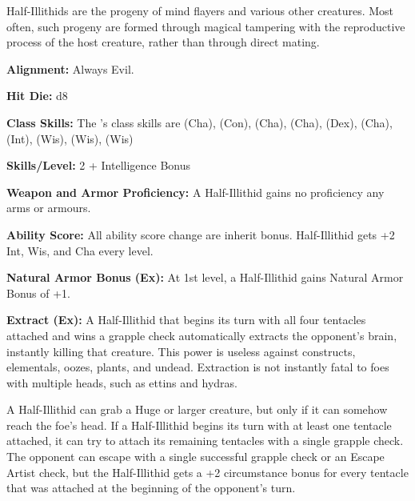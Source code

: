 
Half-Illithids are the progeny of mind flayers and various other creatures. Most often, such progeny are formed through magical tampering with the reproductive process of the host creature, rather than through direct mating.

\textbf{Alignment:} Always Evil.

\textbf{Hit Die:} d8

\textbf{Class Skills:} The \currentclassname{}'s class skills are  (Cha),  (Con),  (Cha),  (Cha),  (Dex),  (Cha),  (Int),  (Wis),  (Wis),  (Wis)

\textbf{Skills/Level:} 2 + Intelligence Bonus

\modebab{}
\poorfor{}
\poorref{}
\goodwil{}

\begin{classtable}
\end{classtable}

\classfeatures

\textbf{Weapon and Armor Proficiency:} A Half-Illithid gains no proficiency any arms or armours.

\textbf{Ability Score:} All ability score change are inherit bonus. Half-Illithid gets +2 Int, Wis, and Cha every level.
 
\textbf{Natural Armor Bonus (Ex):} At 1st level, a Half-Illithid gains Natural Armor Bonus of +1.
 
 \textbf{Extract (Ex):} A Half-Illithid that begins its turn with all four tentacles attached and wins a grapple check automatically extracts the opponent’s brain, instantly killing that creature.
This power is useless against constructs, elementals, oozes, plants, and undead. Extraction is not instantly fatal to foes with multiple heads, such as ettins and hydras.

A Half-Illithid can grab a Huge or larger creature, but only if it can somehow reach the foe’s head. If a Half-Illithid begins its turn with at least one tentacle attached, it can try to attach its remaining tentacles with a single grapple check. The opponent can escape with a single successful grapple check or an Escape Artist check, but the Half-Illithid gets a +2 circumstance bonus for every tentacle that was attached at the beginning of the opponent’s turn.

